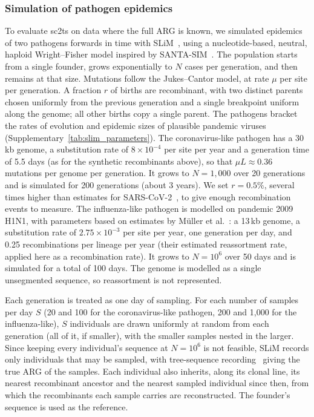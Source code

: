 \documentclass[12pt]{article}
\newcommand{\siref}[1]{Supplementary~\ref{#1}}
\begin{document}
\subsubsection*{Simulation of pathogen epidemics}
To evaluate sc2ts on data where the full ARG is known,
we simulated epidemics of two pathogens forwards in time with
SLiM~\cite{Haller2026slim}, using a nucleotide-based, neutral, haploid
Wright--Fisher model inspired by SANTA-SIM~\cite{Jariani2019santa}.
The population starts from a single founder, grows exponentially to
$N$ cases per generation, and then remains at that size.
Mutations follow the Jukes--Cantor model, at rate $\mu$ per site per generation.
A fraction $r$ of births are recombinant, with two distinct parents
chosen uniformly from the previous generation
and a single breakpoint uniform along the genome;
all other births copy a single parent.
The pathogens bracket the rates of evolution and epidemic sizes of plausible
pandemic viruses (\siref{tab:slim_parameters}). The coronavirus-like pathogen
has a 30\,kb genome, a substitution rate of $8\times10^{-4}$ per site per year \cite{Ghafari2022}
and a generation time of 5.5 days \cite{Hart2022}
(as for the synthetic recombinants above),
so that $\mu L \approx 0.36$ mutations per genome per generation.
It grows to $N=1{,}000$ over 20 generations and is simulated for 200
generations (about 3 years).
We set $r=0.5\%$, several times higher than estimates for
SARS-CoV-2~\cite{Muller2022bayesian}, to give enough recombination events to measure.
The influenza-like pathogen is modelled on pandemic 2009 H1N1,
with parameters based on estimates by M\"uller et al.~\cite{Muller2020bayesian}:
a 13\,kb genome, a substitution rate of $2.75\times10^{-3}$ per site per year,
one generation per day, and 0.25 recombinations per lineage per year
(their estimated reassortment rate, applied here as a recombination rate).
It grows to $N=10^6$ over 50 days and is simulated for a total of 100 days.
The genome is modelled as a single unsegmented sequence,
so reassortment is not represented.

Each generation is treated as one day of sampling.
For each number of samples per day $S$
(20 and 100 for the coronavirus-like pathogen, 200 and 1,000 for the influenza-like),
$S$ individuals are drawn uniformly at random from each generation
(all of it, if smaller), with the smaller samples nested in the larger.
Since keeping every individual's sequence at $N=10^6$ is not feasible,
SLiM records only individuals that may be sampled, with tree-sequence
recording~\cite{Kelleher2018efficient,Haller2019tree} giving the true ARG
of the samples.
Each individual also inherits, along its clonal line,
its nearest recombinant ancestor and the nearest sampled individual since then,
from which the recombinants each sample carries are reconstructed.
The founder's sequence is used as the reference.
\end{document}
